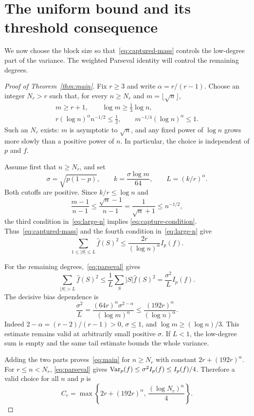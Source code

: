 \section{The uniform bound and its threshold consequence}
\label{sec:completion}

We now choose the block size so that~\eqref{eq:captured-mass}
controls the low-degree part of the variance. The weighted Parseval
identity will control the remaining degrees.

\begin{proof}[Proof of Theorem~\ref{thm:main}]
Fix $r\ge3$ and write $\alpha=r/(r-1)$. Choose an integer $N_r>r$
such that, for every $n\ge N_r$ and $m=\lfloor\sqrt n\rfloor$,
\begin{equation}\label{eq:large-n}
 \begin{gathered}
 m\ge r+1,\qquad \log m\ge\tfrac13\log n,\\
 r(\log n)^\alpha n^{-1/2}\le\tfrac12,\qquad
 m^{-1/4}(\log n)^\alpha\le1.
 \end{gathered}
\end{equation}
Such an $N_r$ exists: $m$ is asymptotic to $\sqrt n$, and any
fixed power of $\log n$ grows more slowly than a positive power of
$n$. In particular, the choice is independent of $p$ and $f$.

Assume first that $n\ge N_r$, and set
\[
 \sigma=\sqrt{p(1-p)},\qquad
 k=\frac{\sigma\log m}{64},\qquad L=(k/r)^\alpha.
\]
Both cutoffs are positive. Since $k/r\le\log n$ and
\[
 \frac{m-1}{n-1}\le\frac{\sqrt n-1}{n-1}
 =\frac1{\sqrt n+1}\le n^{-1/2},
\]
the third condition in~\eqref{eq:large-n} implies
\eqref{eq:capture-condition}. Thus~\eqref{eq:captured-mass} and
the fourth condition in~\eqref{eq:large-n} give
\begin{equation}\label{eq:low-final}
 \sum_{1\le|S|\le L}\widehat f(S)^2
 \le\frac{2r}{(\log n)^\alpha}I_p(f).
\end{equation}

For the remaining degrees,~\eqref{eq:parseval} gives
\[
 \sum_{|S|>L}\widehat f(S)^2
 \le\frac1L\sum_S|S|\widehat f(S)^2
 =\frac{\sigma^2}{L}I_p(f).
\]
The decisive bias dependence is
\begin{equation}\label{eq:bias-cancellation}
 \frac{\sigma^2}{L}
 =\frac{(64r)^\alpha\sigma^{2-\alpha}}{(\log m)^\alpha}
 \le\frac{(192r)^\alpha}{(\log n)^\alpha}.
\end{equation}
Indeed $2-\alpha=(r-2)/(r-1)>0$, $\sigma\le1$, and
$\log m\ge(\log n)/3$. This estimate remains valid at arbitrarily
small positive $\sigma$. If $L<1$, the low-degree sum is empty and
the same tail estimate bounds the whole variance.

Adding the two parts proves~\eqref{eq:main} for $n\ge N_r$ with
constant $2r+(192r)^\alpha$. For $r\le n<N_r$,
\eqref{eq:parseval} gives $\operatorname{Var}_p(f)\le\sigma^2 I_p(f)\le I_p(f)/4$.
Therefore a valid choice for all $n$ and $p$ is
\[
 C_r=\max\left\{2r+(192r)^\alpha,\,
                       \frac{(\log N_r)^\alpha}{4}\right\}.
\]
\end{proof}

